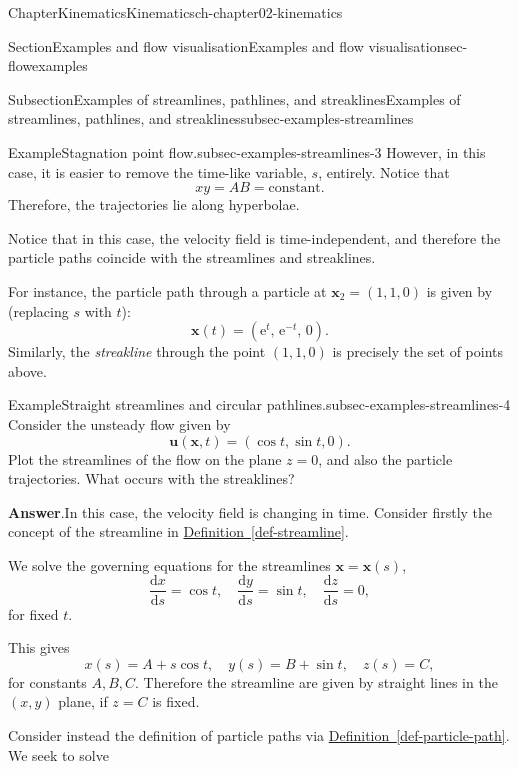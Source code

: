 \documentclass[oneside,10pt,]{book}
\newcommand{\blocktitlefont}{\relax}
\newcommand{\xreffont}{\relax}
\numberwithin{equation}{section}
\newcommand{\e}{\mathrm{e}}
\newcommand{\de}{\mathrm{d}}
\newcommand{\dd}[2]{\frac{\de#1}{\de#2}}
\newcommand{\bx}{\boldsymbol{x}}
\newcommand{\bu}{\boldsymbol{u}}
\begin{document}
\begin{chapterptx}{Chapter}{Kinematics}{}{Kinematics}{}{}{ch-chapter02-kinematics}
\begin{sectionptx}{Section}{Examples and flow visualisation}{}{Examples and flow visualisation}{}{}{sec-flowexamples}
\begin{subsectionptx}{Subsection}{Examples of streamlines, pathlines, and streaklines}{}{Examples of streamlines, pathlines, and streaklines}{}{}{subsec-examples-streamlines}
\begin{example}{Example}{Stagnation point flow.}{subsec-examples-streamlines-3}
However, in this case, it is easier to remove the time-like variable, \(s\), entirely. Notice that%
\begin{equation*}
xy = AB = \textrm{constant}.
\end{equation*}
Therefore, the trajectories lie along hyperbolae.%
\par
Notice that in this case, the velocity field is time-independent, and therefore the particle paths coincide with the streamlines and streaklines.%
\par
For instance, the particle path through a particle at \(\bx_2 = (1, 1, 0)\) is given by (replacing \(s\) with \(t\)):%
\begin{equation*}
\bx(t) = (\e^t, \, \e^{-t}, \, 0).
\end{equation*}
Similarly, the \emph{streakline} through the point \((1, 1, 0)\) is precisely the set of points above.%
\end{example}
\begin{example}{Example}{Straight streamlines and circular pathlines.}{subsec-examples-streamlines-4}%
Consider the unsteady flow given by%
\begin{equation*}
\bu(\bx, t) = (\cos t, \sin t, 0)\text{.}
\end{equation*}
Plot the streamlines of the flow on the plane \(z = 0\), and also the particle trajectories. What occurs with the streaklines?%
\par\smallskip%
\noindent\textbf{\blocktitlefont Answer}.\hypertarget{subsec-examples-streamlines-4-3}{}\quad{}In this case, the velocity field is changing in time. Consider firstly the concept of the streamline in \hyperref[def-streamline]{Definition~{\xreffont\ref{def-streamline}}}.%
\par
We solve the governing equations for the streamlines \(\bx = \bx(s)\),%
\begin{equation*}
\dd{x}{s} = \cos t, \quad \dd{y}{s} = \sin t, \quad \dd{z}{s} = 0,
\end{equation*}
for fixed \(t\).%
\par
This gives%
\begin{equation*}
x(s) = A + s \cos t, \quad y(s) = B + \sin t, \quad z(s) = C,
\end{equation*}
for constants \(A, B, C\). Therefore the streamline are given by straight lines in the \((x, y)\) plane, if \(z = C\) is fixed.%
\par
Consider instead the definition of particle paths via \hyperref[def-particle-path]{Definition~{\xreffont\ref{def-particle-path}}}. We seek to solve%

\end{example}
\end{subsectionptx}
\end{sectionptx}
\end{chapterptx}
\end{document}
